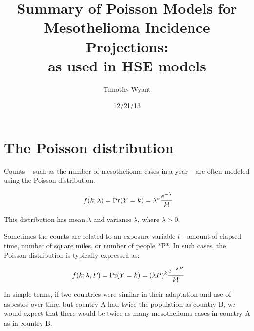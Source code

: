 \documentclass[paper=letter,listof=leveldown,appendixprefix=true]{scrreprt}\usepackage{graphicx, color}
\begin{document}
                     



\title{ Summary of Poisson Models for Mesothelioma Incidence Projections:\\
as used in HSE models}
\author{Timothy Wyant}
\date{ 12/21/13}
\maketitle


\fancyhf{}                          %
\renewcommand{\headrulewidth}{0pt}  %
\fancyfoot[C]{\thepage}             %

\setcounter{page}{1}
\tableofcontents

\chapter{The Poisson distribution}

Counts -- such as the number of mesothelioma cases in a year -- are often modeled using the Poisson distribution.

\begin{equation*}
\ f(k;\lambda) = \text{Pr}(Y=k) = \lambda^k  {e^{-\lambda} \over k!}
\end{equation*}

This distribution has mean $\lambda$ and variance $\lambda$, where $\lambda>0.$

Sometimes the counts are related to an exposure variable $t$ - amount of elapsed time, number of square miles, or number of people *P*.  In such cases, the Poisson distribution is typically expressed as:

\begin{equation*}
\ f(k;\lambda,P) = \text{Pr}(Y=k) = (\lambda P)^k  {e^{-\lambda P} \over k!}
\end{equation*}

In simple terms, if two countries were similar in their adaptation and use of asbestos over time, but country A had twice the population as country B, we would expect that there would be twice as many mesothelioma cases in country A as in country B.
\end{document}
